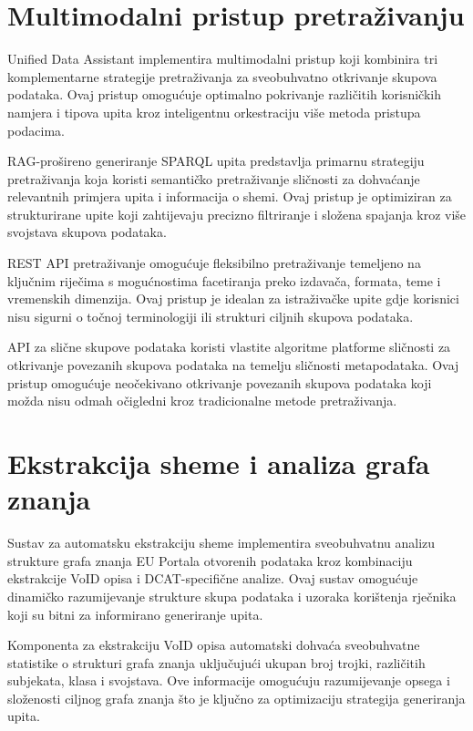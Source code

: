 \section{Multimodalni pristup pretraživanju}
\label{sec:multimodal_approach}

Unified Data Assistant implementira multimodalni pristup koji kombinira tri komplementarne strategije pretraživanja za sveobuhvatno otkrivanje skupova podataka. Ovaj pristup omogućuje optimalno pokrivanje različitih korisničkih namjera i tipova upita kroz inteligentnu orkestraciju više metoda pristupa podacima.

RAG-prošireno generiranje SPARQL upita predstavlja primarnu strategiju pretraživanja koja koristi semantičko pretraživanje sličnosti za dohvaćanje relevantnih primjera upita i informacija o shemi. Ovaj pristup je optimiziran za strukturirane upite koji zahtijevaju precizno filtriranje i složena spajanja kroz više svojstava skupova podataka.

REST API pretraživanje omogućuje fleksibilno pretraživanje temeljeno na ključnim riječima s mogućnostima facetiranja preko izdavača, formata, teme i vremenskih dimenzija. Ovaj pristup je idealan za istraživačke upite gdje korisnici nisu sigurni o točnoj terminologiji ili strukturi ciljnih skupova podataka.

API za slične skupove podataka koristi vlastite algoritme platforme sličnosti za otkrivanje povezanih skupova podataka na temelju sličnosti metapodataka. Ovaj pristup omogućuje neočekivano otkrivanje povezanih skupova podataka koji možda nisu odmah očigledni kroz tradicionalne metode pretraživanja.

\section{Ekstrakcija sheme i analiza grafa znanja}
\label{sec:schema_extraction}

Sustav za automatsku ekstrakciju sheme implementira sveobuhvatnu analizu strukture grafa znanja EU Portala otvorenih podataka kroz kombinaciju ekstrakcije VoID opisa i DCAT-specifične analize. Ovaj sustav omogućuje dinamičko razumijevanje strukture skupa podataka i uzoraka korištenja rječnika koji su bitni za informirano generiranje upita.

Komponenta za ekstrakciju VoID opisa automatski dohvaća sveobuhvatne statistike o strukturi grafa znanja uključujući ukupan broj trojki, različitih subjekata, klasa i svojstava. Ove informacije omogućuju razumijevanje opsega i složenosti ciljnog grafa znanja što je ključno za optimizaciju strategija generiranja upita.


